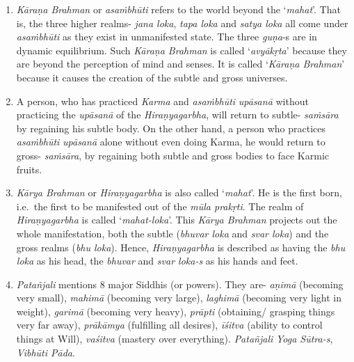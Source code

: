 \begin{enumerate}
\itemsep=0pt
\item
  \emph{Kāraṇa Brahman} or \emph{asaṁbhūti} refers to the world beyond the `\emph{mahat}'. That is, the three higher realms- \emph{jana loka}, \emph{tapa loka} and \emph{satya loka} all come under \emph{asaṁbhūti} as they exist in unmanifested state. The three \emph{guṇa}-s are in dynamic equilibrium. Such \emph{Kāraṇa Brahman} is called `\emph{avyākṛta}' because they are beyond the perception of mind and senses. It is called `\emph{Kāraṇa Brahman}' because it causes the creation of the subtle and gross universes.
\item
  A person, who has practiced \emph{Karma} and \emph{asaṁbhūti} \emph{upāsanā} without practicing the \emph{upāsanā} of the \emph{Hiraṇyagarbha}, will return to subtle- \emph{saṁsāra} by regaining his subtle body. On the other hand, a person who practices \emph{asaṁbhūti} \emph{upāsanā} alone without even doing Karma, he would return to gross- \emph{saṁsāra}, by regaining both subtle and gross bodies to face Karmic fruits.
\item
  \emph{Kārya Brahman} or \emph{Hiraṇyagarbha} is also called `\emph{mahat}'. He is the first born, i.e.\ the first to be manifested out of the \emph{mūla prakṛti}. The realm of \emph{Hiraṇyagarbha} is called `\emph{mahat-loka}'. This \emph{Kārya Brahman} projects out the whole manifestation, both the subtle (\emph{bhuvar loka} and \emph{svar loka}) and the gross realms (\emph{bhu loka}). Hence, \emph{Hiraṇyagarbha} is described as having the \emph{bhu loka} as his head, the \emph{bhuvar} and \emph{svar loka-s} as his hands and feet.
\item
  \emph{Patañjali} mentions 8 major Siddhis (or powers). They are- \emph{aṇimā} (becoming very small), \emph{mahimā} (becoming very large), \emph{laghimā} (becoming very light in weight), \emph{garimā} (becoming very heavy), \emph{prāpti} (obtaining/ grasping things very far away), \emph{prākāmya} (fulfilling all desires), \emph{īśitva} (ability to control things at Will), \emph{vaśitva} (mastery over everything). \emph{Patañjali} \emph{Yoga Sūtra-s}, \emph{Vibhūti Pāda}.
\end{enumerate}

